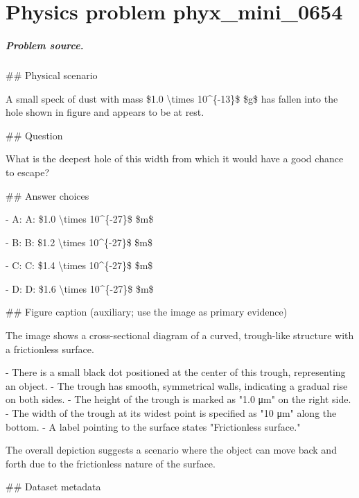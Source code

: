 
\chapter{Physics problem phyx\_mini\_0654}
\label{ch:PhyXMiniProblems_problem_phyx_mini_0654}

\paragraph{Problem source.}
\#\# Physical scenario

A small speck of dust with mass \$1.0 \textbackslash{}times 10\textasciicircum{}\{-13\}\$ \$g\$ has fallen into the hole shown in figure and appears to be at rest.

\#\# Question

What is the deepest hole of this width from which it would have a good chance to escape?

\#\# Answer choices

- A: A: \$1.0 \textbackslash{}times 10\textasciicircum{}\{-27\}\$ \$m\$

- B: B: \$1.2 \textbackslash{}times 10\textasciicircum{}\{-27\}\$ \$m\$

- C: C: \$1.4 \textbackslash{}times 10\textasciicircum{}\{-27\}\$ \$m\$

- D: D: \$1.6 \textbackslash{}times 10\textasciicircum{}\{-27\}\$ \$m\$

\#\# Figure caption (auxiliary; use the image as primary evidence)

The image shows a cross-sectional diagram of a curved, trough-like structure with a frictionless surface. 

- There is a small black dot positioned at the center of this trough, representing an object.
- The trough has smooth, symmetrical walls, indicating a gradual rise on both sides.
- The height of the trough is marked as "1.0 μm" on the right side.
- The width of the trough at its widest point is specified as "10 μm" along the bottom.
- A label pointing to the surface states "Frictionless surface."

The overall depiction suggests a scenario where the object can move back and forth due to the frictionless nature of the surface.

\#\# Dataset metadata

